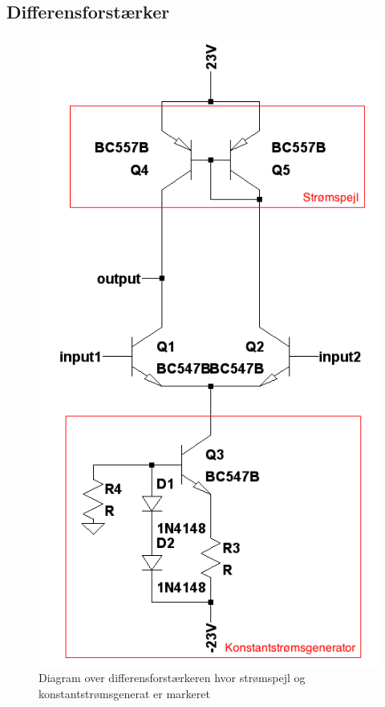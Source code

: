 \subsection{Differensforstærker}
\label{effekt_differensforstaerker}

\begin{figure}[h]
\centering
\includegraphics[scale=.2]{teknisk/effektforstaerker/differensforstaerker.png}
\caption{Diagram over differensforstærkeren hvor strømspejl og konstantstrømsgenerat er markeret}
\label{fig:differensforstaerker}
\end{figure}

